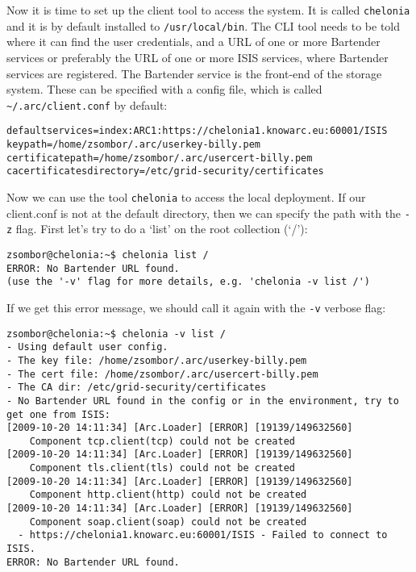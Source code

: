 \documentclass{article}
\begin{document}
Now it is time to set up the client tool to access the system. It is called \verb!chelonia! and it is by default installed to \verb!/usr/local/bin!. The CLI tool needs to be told where it can find the user credentials, and a URL of one or more Bartender services or preferably the URL of one or more ISIS services, where Bartender services are registered. The Bartender service is the front-end of the storage system. These can be specified with a config file, which is called \verb!~/.arc/client.conf! by default:

\begin{verbatim}
defaultservices=index:ARC1:https://chelonia1.knowarc.eu:60001/ISIS
keypath=/home/zsombor/.arc/userkey-billy.pem
certificatepath=/home/zsombor/.arc/usercert-billy.pem
cacertificatesdirectory=/etc/grid-security/certificates
\end{verbatim}

Now we can use the tool \verb!chelonia! to access the local deployment. If our client.conf is not at the default directory, then we can specify the path with the \verb!-z! flag. First let's try to do a `list' on the root collection (`/'):

\begin{verbatim}
zsombor@chelonia:~$ chelonia list /
ERROR: No Bartender URL found.
(use the '-v' flag for more details, e.g. 'chelonia -v list /')
\end{verbatim}

If we get this error message, we should call it again with the \verb!-v! verbose flag:
\begin{verbatim}
zsombor@chelonia:~$ chelonia -v list /
- Using default user config.
- The key file: /home/zsombor/.arc/userkey-billy.pem
- The cert file: /home/zsombor/.arc/usercert-billy.pem
- The CA dir: /etc/grid-security/certificates
- No Bartender URL found in the config or in the environment, try to get one from ISIS:
[2009-10-20 14:11:34] [Arc.Loader] [ERROR] [19139/149632560]
    Component tcp.client(tcp) could not be created
[2009-10-20 14:11:34] [Arc.Loader] [ERROR] [19139/149632560]
    Component tls.client(tls) could not be created
[2009-10-20 14:11:34] [Arc.Loader] [ERROR] [19139/149632560] 
    Component http.client(http) could not be created
[2009-10-20 14:11:34] [Arc.Loader] [ERROR] [19139/149632560] 
    Component soap.client(soap) could not be created
  - https://chelonia1.knowarc.eu:60001/ISIS - Failed to connect to ISIS.
ERROR: No Bartender URL found.
\end{verbatim}
\end{document}
